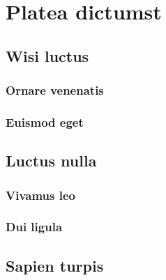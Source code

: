 \section{Platea dictumst} \lipsum[13-14]
\subsection{Wisi luctus} \lipsum[15]
\subsubsection{Ornare venenatis} \lipsum[16]
\subsubsection{Euismod eget} \lipsum[17]
\subsection{Luctus nulla} \lipsum [18]
\subsubsection{Vivamus leo} \lipsum[19]
\subsubsection{Dui ligula} \lipsum[20]
\subsection{Sapien turpis} \lipsum [21-22]
